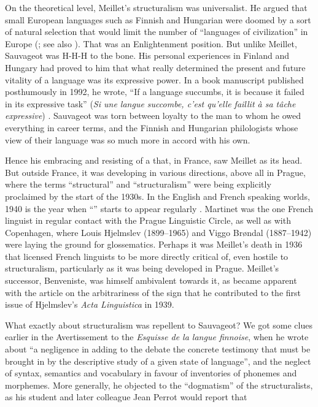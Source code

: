 \documentclass[output=paper]{langscibook}
\begin{document}
On the theoretical level, Meillet's structuralism was universalist. He argued that small European languages such as Finnish and Hungarian were doomed by a sort of natural selection that would limit the number of ``languages of civilization'' in Europe (\citealt[279]{Meillet1918}; see also \citealt[209--210]{Sauvageot2013}). That was an Enlightenment position. But unlike Meillet, Sauvageot was H-H-H to the bone. His personal experiences in Finland and Hungary had proved to him that what really determined the present and future vitality of a language was its expressive power. In a book manuscript published posthumously in 1992, he wrote, ``If a language succumbs, it is because it failed in its expressive task'' (\emph{Si une langue succombe, c'est qu'elle faillit à sa tâche expressive}) \citep[160]{Sauvageot1992}. Sauvageot was torn between loyalty to the man to whom he owed everything in career terms, and the Finnish and Hungarian philologists whose view of their language was so much more in accord with his own.

Hence his embracing and resisting of a  that, in France, saw Meillet as its head. But outside France, it was developing in various directions, above all in Prague, where the terms ``structural'' and ``structuralism'' were being explicitly proclaimed by the start of the 1930s. In the English and French speaking worlds, 1940 is the year when ``'' starts to appear regularly \citep[see][]{Joseph2015}. Martinet was the one French linguist in regular contact with the Prague Linguistic Circle, as well as with Copenhagen, where Louis Hjelmslev (1899--1965) and Viggo Brøndal (1887--1942) were laying the ground for glossematics. Perhaps it was Meillet's death in 1936 that licensed French linguists to be more directly critical of, even hostile to structuralism, particularly as it was being developed in Prague. Meillet's successor, Benveniste, was himself ambivalent towards it, as became apparent with the article on the arbitrariness of the sign that he contributed to the first issue of Hjelmslev's \emph{Acta Linguistica} in 1939.

What exactly about structuralism was repellent to Sauvageot? We got some clues earlier in the Avertissement to the \emph{Esquisse de la langue finnoise}, when he wrote about ``a negligence in adding to the debate the concrete testimony that must be brought in by the descriptive study of a given state of language'', and the neglect of syntax, semantics and vocabulary in favour of inventories of phonemes and morphemes. More generally, he objected to the ``dogmatism'' of the structuralists, as his student and later colleague Jean Perrot would report that
\end{document}
